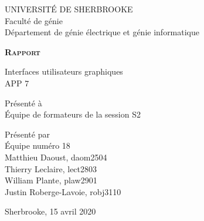 \begin{titlepage}
    \centering
    UNIVERSITÉ DE SHERBROOKE\\
    Faculté de génie\\
    Département de génie électrique et génie informatique

    \vfill

    {\LARGE \bfseries \scshape Rapport}

    \vfill

    Interfaces utilisateurs graphiques\\
    APP 7

    \vfill
    
    Présenté à\\
    Équipe de formateurs de la session S2

    \vfill

    Présenté par\\
    Équipe numéro 18\\
    Matthieu Daoust, daom2504\\
    Thierry Leclaire, lect2803\\
    William Plante, plaw2901\\
    Justin Roberge-Lavoie, robj3110

    \vfill

    Sherbrooke, 15 avril 2020
\end{titlepage}
